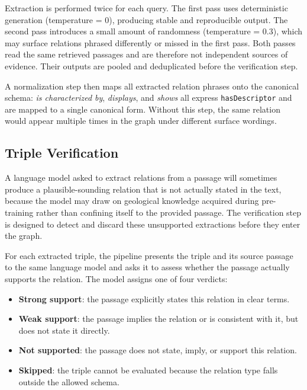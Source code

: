 \documentclass[10pt]{article}
\newcommand{\pred}[1]{\texttt{\small #1}}
\begin{document}
Extraction is performed twice for each query.
The first pass uses deterministic generation (temperature = 0),
producing stable and reproducible output.
The second pass introduces a small amount of randomness
(temperature = 0.3), which may surface relations phrased
differently or missed in the first pass.
Both passes read the same retrieved passages and are therefore
not independent sources of evidence.
Their outputs are pooled and deduplicated before the
verification step.

A normalization step then maps all extracted relation phrases
onto the canonical schema: \emph{is characterized by},
\emph{displays}, and \emph{shows} all express
\pred{hasDescriptor} and are mapped to a single canonical
form.
Without this step, the same relation would appear multiple
times in the graph under different surface wordings.

\subsection{Triple Verification}
\label{sec:verification}

A language model asked to extract relations from a passage
will sometimes produce a plausible-sounding relation that is
not actually stated in the text, because the model may draw
on geological knowledge acquired during pre-training rather
than confining itself to the provided passage.
The verification step is designed to detect and discard
these unsupported extractions before they enter the graph.

For each extracted triple, the pipeline presents the triple
and its source passage to the same language model and asks
it to assess whether the passage actually supports the
relation.
The model assigns one of four verdicts:

\begin{itemize}
  \item \textbf{Strong support}: the passage explicitly
  states this relation in clear terms.
  \item \textbf{Weak support}: the passage implies the
  relation or is consistent with it, but does not state
  it directly.
  \item \textbf{Not supported}: the passage does not state,
  imply, or support this relation.
  \item \textbf{Skipped}: the triple cannot be evaluated
  because the relation type falls outside the allowed
  schema.
\end{itemize}
\end{document}
